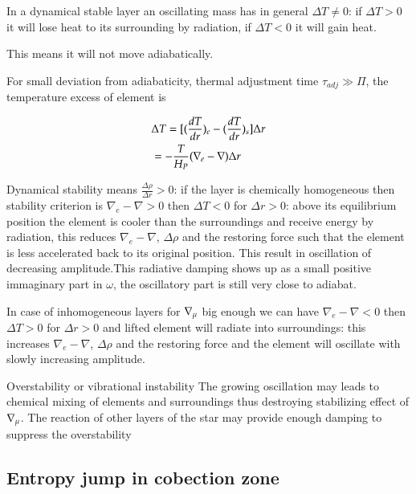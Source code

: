 \documentclass[../main.tex]{subfiles}
\begin{document}
In a dynamical stable layer an oscillating mass has in general $\Delta T\neq0$: if $\Delta T>0$ it will lose heat to its surrounding by radiation, if $\Delta T<0$ it will gain heat.

This means it will not move adiabatically.

For small deviation from adiabaticity, thermal adjustment time $\tau_{adj}\gg\Pi$, the temperature excess of element is

\begin{align*}
&\Delta T=[\Dcvar{\TDy{r}{T}}{e}-\Dcvar{\TDy{r}{T}}{s}]\Delta r\\
&=-\frac{T}{H_P}(\nabla_e-\nabla)\Delta r
\end{align*}

Dynamical stability means $\frac{\Delta\rho}{\Delta r}>0$: if the layer is chemically homogeneous then stability criterion is $\nabla_e-\nabla>0$ then $\Delta T<0$ for $\Delta r>0$: above its equilibrium position the element is cooler than the surroundings and receive energy by radiation, this reduces $\nabla_e-\nabla$, $\Delta\rho$ and the restoring force such that the element is less accelerated back to its original position. This result in oscillation of decreasing amplitude.This radiative damping shows up as a small positive immaginary part in $\omega$, the oscillatory part is still very close to adiabat.

In case of inhomogeneous layers for $\nmu{}$ big enough we can have $\nabla_e-\nabla<0$ then $\Delta T>0$ for $\Delta r>0$ and lifted element will radiate into surroundings: this increases $\nabla_e-\nabla$, $\Delta\rho$ and the restoring force and the element will oscillate with slowly increasing amplitude.

\begin{usefull}{Overstability or vibrational instability}
The growing oscillation may leads to chemical mixing of elements and surroundings thus destroying stabilizing effect of $\nmu{}$.
The reaction of other layers of the star may provide enough damping to suppress the overstability
\end{usefull}


\subsection{Entropy jump in cobection zone}
\end{document}
